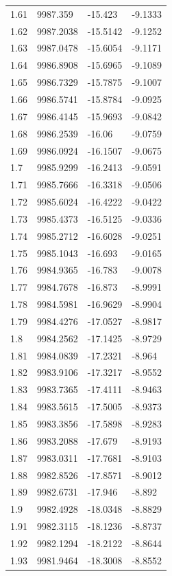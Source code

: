 \begin{table}[H]
\begin{tabular}{llll}
1.61 & 9987.359 & -15.423 & -9.1333 \\
1.62 & 9987.2038 & -15.5142 & -9.1252 \\
1.63 & 9987.0478 & -15.6054 & -9.1171 \\
1.64 & 9986.8908 & -15.6965 & -9.1089 \\
1.65 & 9986.7329 & -15.7875 & -9.1007 \\
1.66 & 9986.5741 & -15.8784 & -9.0925 \\
1.67 & 9986.4145 & -15.9693 & -9.0842 \\
1.68 & 9986.2539 & -16.06 & -9.0759 \\
1.69 & 9986.0924 & -16.1507 & -9.0675 \\
1.7 & 9985.9299 & -16.2413 & -9.0591 \\
1.71 & 9985.7666 & -16.3318 & -9.0506 \\
1.72 & 9985.6024 & -16.4222 & -9.0422 \\
1.73 & 9985.4373 & -16.5125 & -9.0336 \\
1.74 & 9985.2712 & -16.6028 & -9.0251 \\
1.75 & 9985.1043 & -16.693 & -9.0165 \\
1.76 & 9984.9365 & -16.783 & -9.0078 \\
1.77 & 9984.7678 & -16.873 & -8.9991 \\
1.78 & 9984.5981 & -16.9629 & -8.9904 \\
1.79 & 9984.4276 & -17.0527 & -8.9817 \\
1.8 & 9984.2562 & -17.1425 & -8.9729 \\
1.81 & 9984.0839 & -17.2321 & -8.964 \\
1.82 & 9983.9106 & -17.3217 & -8.9552 \\
1.83 & 9983.7365 & -17.4111 & -8.9463 \\
1.84 & 9983.5615 & -17.5005 & -8.9373 \\
1.85 & 9983.3856 & -17.5898 & -8.9283 \\
1.86 & 9983.2088 & -17.679 & -8.9193 \\
1.87 & 9983.0311 & -17.7681 & -8.9103 \\
1.88 & 9982.8526 & -17.8571 & -8.9012 \\
1.89 & 9982.6731 & -17.946 & -8.892 \\
1.9 & 9982.4928 & -18.0348 & -8.8829 \\
1.91 & 9982.3115 & -18.1236 & -8.8737 \\
1.92 & 9982.1294 & -18.2122 & -8.8644 \\
1.93 & 9981.9464 & -18.3008 & -8.8552 \\

\end{tabular}
\end{table}

